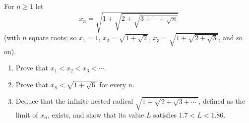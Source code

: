 For $n\ge1$ let
\[x_n=\sqrt{1+\sqrt{2+\sqrt{3+\cdots+\sqrt{n}}}}\]
(with $n$ square roots; so $x_1=1$, $x_2=\sqrt{1+\sqrt2}$, $x_3=\sqrt{1+\sqrt{2+\sqrt3}}$, and so on).
\begin{enumerate}
\item[(a)] Prove that $x_1<x_2<x_3<\cdots$.
\item[(b)] Prove that $x_n<\sqrt{1+\sqrt6}$ for every $n$.
\item[(c)] Deduce that the infinite nested radical $\sqrt{1+\sqrt{2+\sqrt{3+\cdots}}}$, defined as the limit of $x_n$, exists, and show that its value $L$ satisfies $1.7<L<1.86$.
\end{enumerate}
